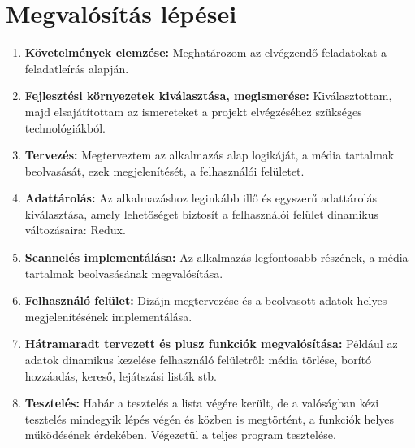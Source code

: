 \section{Megvalósítás lépései}
\begin{enumerate}
    \item {\textbf {Követelmények elemzése: }} Meghatározom az elvégzendő feladatokat a feladatleírás alapján.
    \item {\textbf {Fejlesztési környezetek kiválasztása, megismerése: }} Kiválasztottam, majd elsajátítottam az ismereteket a projekt elvégzéséhez szükséges technológiákból.
    \item {\textbf {Tervezés: }} Megterveztem az alkalmazás alap logikáját, a média tartalmak beolvasását, ezek megjelenítését, a felhasználói felületet.
    \item {\textbf {Adattárolás: }} Az alkalmazáshoz leginkább illő és egyszerű adattárolás kiválasztása, amely lehetőséget biztosít a felhasználói felület dinamikus változásaira: Redux.
    \item {\textbf {Scannelés implementálása: }} Az alkalmazás legfontosabb részének, a média tartalmak beolvasásának megvalósítása.
    \item {\textbf {Felhasználó felület: }} Dizájn megtervezése és a beolvasott adatok helyes megjelenítésének implementálása.
    \item {\textbf {Hátramaradt tervezett és plusz funkciók megvalósítása: }} Például az adatok dinamikus kezelése felhasználó felületről: média törlése, borító hozzáadás, kereső, lejátszási listák stb.
    \item {\textbf {Tesztelés: }} Habár a tesztelés a lista végére került, de a valóságban kézi tesztelés mindegyik lépés végén és közben is megtörtént, a funkciók helyes működésének érdekében. Végezetül a teljes program tesztelése.
\end{enumerate}

